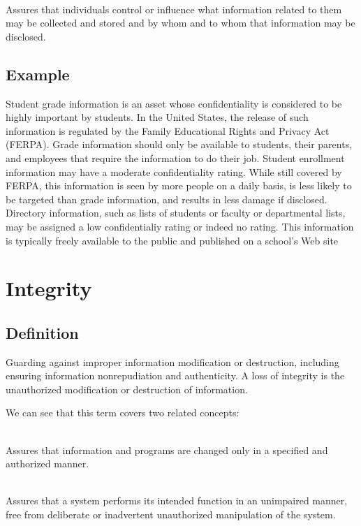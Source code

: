 \documentclass[12pt]{article}
\begin{document}
    			\\
    		Assures that individuals control or influence what information related to them may be collected and stored and by whom and to whom that information may be disclosed.

    	\subsection{Example}
    		Student grade information is an asset whose confidentiality is considered to be highly important by students. In the United States, the release of such information is regulated by the Family Educational Rights and Privacy Act (FERPA). Grade information should only be available to students, their parents, and employees that require the information to do their job. Student enrollment information may have a moderate confidentiality rating. While still covered by FERPA, this information is seen by more people on a daily basis, is less likely to be targeted than grade information, and results in less damage if disclosed. Directory information, such as lists of students or faculty or departmental lists, may be assigned a low confidentialiy rating or indeed no rating. This information is typically freely available to the public and published on a school's Web site

    \section{Integrity}
    	\subsection{Definition}
    		Guarding against improper information modification or destruction, including ensuring information nonrepudiation and authenticity. A loss of integrity is the unauthorized modification or destruction of information.

    		We can see that this term covers two related concepts:

    			\\
    		Assures that information and programs are changed only in a specified and authorized manner.

    			\\
    		Assures that a system performs its intended function in an unimpaired manner, free from deliberate or inadvertent unauthorized manipulation of the system.
\end{document}
